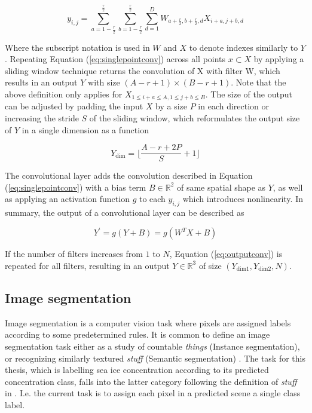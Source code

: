 \documentclass[../main/thesis.tex]{subfiles}
\begin{document}
\begin{equation}
    \label{eq:singlepointconv}
    y_{i,j} = \sum_{a=1-\frac{r}{2}}^\frac{r}{2} \sum_{b=1-\frac{r}{2}}^\frac{r}{2} \sum_{d=1}^D W_{a + \frac{r}{2},b + \frac{r}{2}, d} X_{i+a,j+b,d}
\end{equation}

Where the subscript notation is used in $W$ and $X$ to denote indexes similarly to $Y$. Repeating Equation (\ref{eq:singlepointconv}) across all points $x \subset X$ by applying a sliding window technique returns the convolution of X with filter W, which results in an output $Y$ with size $(A-r+1) \times (B-r+1)$. Note that the above definition only applies for $X_{1 \leq i+a \leq A, 1 \leq j+b \leq B}$. The size of the output can be adjusted by padding the input $X$ by a size $P$ in each direction or increasing the stride $S$ of the sliding window, which reformulates the output size of $Y$ in a single dimension as a function

\begin{equation}
    \label{eq:outputdim}
    Y_\text{dim} = \lfloor\frac{A - r + 2P}{S} + 1\rfloor    
\end{equation}

The convolutional layer adds the convolution described in Equation (\ref{eq:singlepointconv}) with a bias term $B \in{\mathbb{R}^2}$ of same spatial shape as $Y$, as well as applying an activation function $g$ to each $y_{i,j}$ which introduces nonlinearity. In summary, the output of a convolutional layer can be described as 

\begin{equation}
    \label{eq:outputconv}
    Y^\prime = g(Y + B) = g(W^TX + B)
\end{equation}

If the number of filters increases from $1$ to $N$, Equation (\ref{eq:outputconv}) is repeated for all filters, resulting in an output $Y \in{\mathbb{R}^3}$ of size $(Y_\text{dim1}, Y_\text{dim2}, N)$.

\subsection{Image segmentation}
\label{sec:image-segmentation}
Image segmentation is a computer vision task where pixels are assigned labels according to some predetermined rules. It is common to define an image segmentation task either as a study of countable \textit{things} (Instance segmentation), or recognizing similarly textured \textit{stuff} (Semantic segmentation) \citep{Kirillov2018}. The task for this thesis, which is labelling sea ice concentration according to its predicted concentration class, falls into the latter category following the definition of \textit{stuff} in \citet{Adelson2001}. I.e. the current task is to assign each pixel in a predicted scene a single class label.
\end{document}

